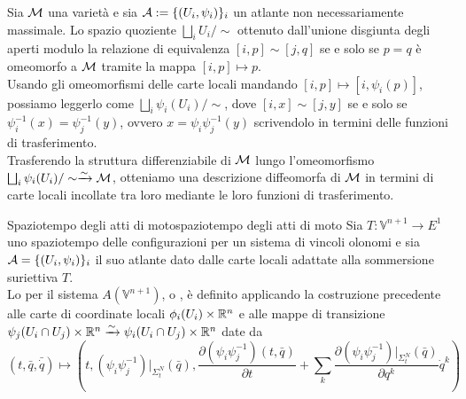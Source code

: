 \documentclass[openany]{book}
\renewcommand\A{\mc{A}}
\renewcommand\V{\mathbb{V}}
\begin{document}
Sia $\mathcal{M}$ una varietà e sia $\A := \{ (U_i,\psi_i) \}_i$ un atlante non necessariamente massimale. Lo spazio quoziente $\bigsqcup_i U_i/\sim$ ottenuto dall'unione disgiunta degli aperti modulo la relazione di equivalenza $[i,p]\sim[j, q]$ se e solo se $p=q$ è omeomorfo a $\mathcal{M}$ tramite la mappa $[i,p]\mapsto p$.\\
Usando gli omeomorfismi delle carte locali mandando $[i,p]\mapsto [i,\psi_i(p)]$, possiamo leggerlo come $ \bigsqcup_i \psi_i(U_i)/\sim $, dove $[i,x]\sim[j,y]$ se e solo se $\psi_i^{-1}(x) = \psi_j^{-1}(y)$, ovvero $x = \psi_i\psi_j^{-1}(y)$ scrivendolo in termini delle funzioni di trasferimento.\\
Trasferendo la struttura differenziabile di $\mathcal{M}$ lungo l'omeomorfismo $\bigsqcup_i \psi_i(U_i)/\sim \xrightarrow{\sim} \mathcal{M}$, otteniamo una descrizione diffeomorfa di $\mathcal{M}$ in termini di carte locali incollate tra loro mediante le loro funzioni di trasferimento.

\begin{definition}{Spaziotempo degli atti di moto}{spaziotempo degli atti di moto}
    Sia $T:\V^{n+1}\to E^1$ uno spaziotempo delle configurazioni per un sistema di vincoli olonomi e sia $\A = \{(U_i,\psi_i)\}_i$ il suo atlante dato dalle carte locali adattate alla sommersione suriettiva $T$.\\
    Lo  per il sistema $A(\V^{n+1})$, o , è definito applicando la costruzione precedente alle carte di coordinate locali $\phi_i(U_i)\times\mathbb{R}^n$ e alle mappe di transizione $\psi_j(U_i\cap U_j)\times\mathbb{R}^n\xrightarrow{\sim} \psi_i(U_i\cap U_j)\times \mathbb{R}^n$ date da
    \[ (t,\bar q ,\bar{\dot q}) \mapsto \left( t, (\psi_i\psi_j^{-1})|_{\Sigma_t^N}(\bar q), \frac{\partial (\psi_i\psi_j^{-1})(t, \bar q) }{\partial t} + \sum_k \frac{\partial (\psi_i\psi_j^{-1})|_{\Sigma_t^N}(\bar q) }{\partial q^k} \dot q^k \right) \] 
\end{definition}
\end{document}
